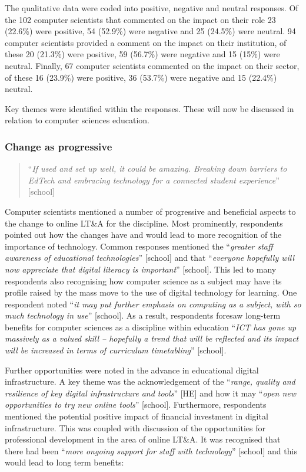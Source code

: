 \documentclass[sigconf]{acmart}
\begin{document}
The qualitative data were coded into positive, negative and neutral
responses. Of the 102 computer scientists that commented on the impact
on their role 23 (22.6\%) were positive, 54 (52.9\%) were negative and
25 (24.5\%) were neutral.  94 computer scientists provided a comment
on the impact on their institution, of these 20 (21.3\%) were
positive, 59 (56.7\%) were negative and 15 (15\%) were
neutral. Finally, 67 computer scientists commented on the impact on
their sector, of these 16 (23.9\%) were positive, 36 (53.7\%) were
negative and 15 (22.4\%) neutral.

Key themes were identified within the responses. These will now be
discussed in relation to computer sciences education.

\subsubsection{Change as progressive}

\begin{quotation}
``{\emph{If used and set up well, it could be amazing.  Breaking down
barriers to EdTech and embracing technology for a connected student
experience}}'' [school]
\end{quotation}

Computer scientists mentioned a number of progressive and beneficial
aspects to the change to online LT\&A for the discipline. Most
prominently, respondents pointed out how the changes have and would
lead to more recognition of the importance of technology. Common
responses mentioned the ``{\emph{greater staff awareness of
educational technologies}}” [school] and that ``{\emph{everyone
hopefully will now appreciate that digital literacy is important}}''
[school]. This led to many respondents also recognising how computer
science as a subject may have its profile raised by the mass move to
the use of digital technology for learning. One respondent noted
``{\emph{it may put further emphasis on computing as a subject, with
so much technology in use}}'' [school]. As a result, respondents
foresaw long-term benefits for computer sciences as a discipline
within education ``{\emph{ICT has gone up massively as a valued skill
-- hopefully a trend that will be reflected and its impact will be
increased in terms of curriculum timetabling}}'' [school].

Further opportunities were noted in the advance in educational digital
infrastructure. A key theme was the acknowledgement of the
``{\emph{range, quality and resilience of key digital infrastructure
and tools}}'' [HE] and how it may ``{\emph{open new opportunities to
try new online tools}}'' [school]. Furthermore, respondents mentioned
the potential positive impact of financial investment in digital
infrastructure. This was coupled with discussion of the opportunities
for professional development in the area of online LT\&A. It was
recognised that there had been ``{\emph{more ongoing support for staff
with technology}}'' [school] and this would lead to long term
benefits:
\end{document}
